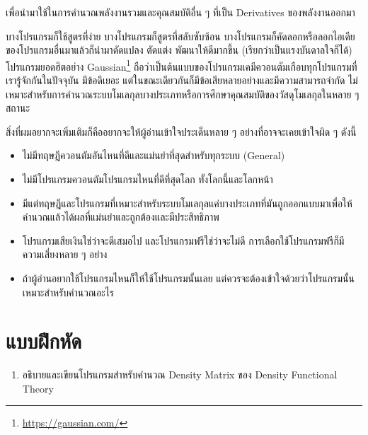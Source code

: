 \noindent เพื่อนำมาใช้ในการคำนวณพลังงานรวมและคุณสมบัติอื่น ๆ ที่เป็น Derivatives ของพลังงานออกมา

บางโปรแกรมก็ใช้สูตรที่ง่าย บางโปรแกรมก็สูตรที่สลับซับซ้อน บางโปรแกรมก็คัดลอกหรือลอกไอเดียของโปรแกรมอื่นมาแล้วก็นำมาดัดแปลง ตัดแต่ง
พัฒนาให้ดีมากขึ้น (เรียกว่าเป็นแรงบันดาลใจก็ได้) โปรแกรมยอดฮิตอย่าง Gaussian\footnote{\url{https://gaussian.com/}}
ถือว่าเป็นต้นแบบของโปรแกรมเคมีควอนตัมเกือบทุกโปรแกรมที่เรารู้จักกันในปัจจุบัน มีข้อดีเยอะ แต่ในขณะเดียวกันก็มีข้อเสียหลายอย่างและมีความสามารถจำกัด
ไม่เหมาะสำหรับการคำนวณระบบโมเลกุลบางประเภทหรือการศึกษาคุณสมบัติของวัสดุโมเลกุลในหลาย ๆ สถานะ

สิ่งที่ผมอยากจะเพิ่มเติมก็คืออยากจะให้ผู้อ่านเข้าใจประเด็นหลาย ๆ อย่างที่อาจจะเคยเข้าใจผิด ๆ ดังนี้

\begin{itemize}[topsep=0pt]
  \item ไม่มีทฤษฎีควอนตัมอันไหนที่ดีและแม่นยำที่สุดสำหรับทุกระบบ (General)

  \item ไม่มีโปรแกรมควอนตัมโปรแกรมไหนที่ดีที่สุดโลก ทั้งโลกนี้และโลกหน้า

  \item มีแต่ทฤษฎีและโปรแกรมที่เหมาะสำหรับระบบโมเลกุลแค่บางประเภทที่มันถูกออกแบบมาเพื่อให้คำนวณแล้วได้ผลที่แม่นยำและถูกต้องและมีประสิทธิภาพ

  \item โปรแกรมเสียเงินใช่ว่าจะดีเสมอไป และโปรแกรมฟรีใช่ว่าจะไม่ดี การเลือกใช้โปรแกรมฟรีก็มีความเสี่ยงหลาย ๆ อย่าง

  \item ถ้าผู้อ่านอยากใช้โปรแกรมไหนก็ให้ใช้โปรแกรมนั้นเลย แต่ควรจะต้องเข้าใจด้วยว่าโปรแกรมนั้นเหมาะสำหรับคำนวณอะไร
\end{itemize}

\section{แบบฝึกหัด}

\begin{enumerate}[topsep=0pt,noitemsep]
  \setlength\itemsep{1em}
  \item อธิบายและเขียนโปรแกรมสำหรับคำนวณ Density Matrix ของ Density Functional Theory
\end{enumerate}

